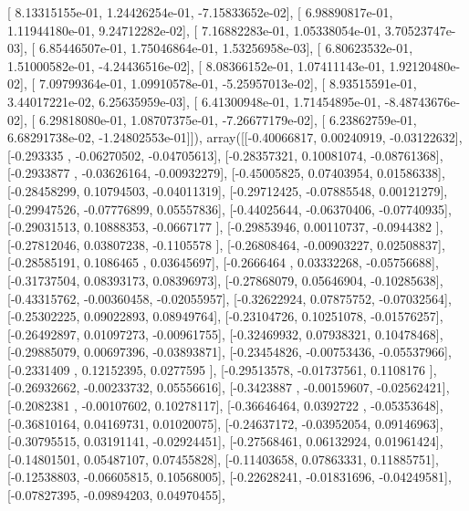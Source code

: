 \documentclass{article}
\begin{document}
       [  8.13315155e-01,   1.24426254e-01,  -7.15833652e-02],
       [  6.98890817e-01,   1.11944180e-01,   9.24712282e-02],
       [  7.16882283e-01,   1.05338054e-01,   3.70523747e-03],
       [  6.85446507e-01,   1.75046864e-01,   1.53256958e-03],
       [  6.80623532e-01,   1.51000582e-01,  -4.24436516e-02],
       [  8.08366152e-01,   1.07411143e-01,   1.92120480e-02],
       [  7.09799364e-01,   1.09910578e-01,  -5.25957013e-02],
       [  8.93515591e-01,   3.44017221e-02,   6.25635959e-03],
       [  6.41300948e-01,   1.71454895e-01,  -8.48743676e-02],
       [  6.29818080e-01,   1.08707375e-01,  -7.26677179e-02],
       [  6.23862759e-01,   6.68291738e-02,  -1.24802553e-01]]), array([[-0.40066817,  0.00240919, -0.03122632],
       [-0.293335  , -0.06270502, -0.04705613],
       [-0.28357321,  0.10081074, -0.08761368],
       [-0.2933877 , -0.03626164, -0.00932279],
       [-0.45005825,  0.07403954,  0.01586338],
       [-0.28458299,  0.10794503, -0.04011319],
       [-0.29712425, -0.07885548,  0.00121279],
       [-0.29947526, -0.07776899,  0.05557836],
       [-0.44025644, -0.06370406, -0.07740935],
       [-0.29031513,  0.10888353, -0.0667177 ],
       [-0.29853946,  0.00110737, -0.0944382 ],
       [-0.27812046,  0.03807238, -0.1105578 ],
       [-0.26808464, -0.00903227,  0.02508837],
       [-0.28585191,  0.1086465 ,  0.03645697],
       [-0.2666464 ,  0.03332268, -0.05756688],
       [-0.31737504,  0.08393173,  0.08396973],
       [-0.27868079,  0.05646904, -0.10285638],
       [-0.43315762, -0.00360458, -0.02055957],
       [-0.32622924,  0.07875752, -0.07032564],
       [-0.25302225,  0.09022893,  0.08949764],
       [-0.23104726,  0.10251078, -0.01576257],
       [-0.26492897,  0.01097273, -0.00961755],
       [-0.32469932,  0.07938321,  0.10478468],
       [-0.29885079,  0.00697396, -0.03893871],
       [-0.23454826, -0.00753436, -0.05537966],
       [-0.2331409 ,  0.12152395,  0.0277595 ],
       [-0.29513578, -0.01737561,  0.1108176 ],
       [-0.26932662, -0.00233732,  0.05556616],
       [-0.3423887 , -0.00159607, -0.02562421],
       [-0.2082381 , -0.00107602,  0.10278117],
       [-0.36646464,  0.0392722 , -0.05353648],
       [-0.36810164,  0.04169731,  0.01020075],
       [-0.24637172, -0.03952054,  0.09146963],
       [-0.30795515,  0.03191141, -0.02924451],
       [-0.27568461,  0.06132924,  0.01961424],
       [-0.14801501,  0.05487107,  0.07455828],
       [-0.11403658,  0.07863331,  0.11885751],
       [-0.12538803, -0.06605815,  0.10568005],
       [-0.22628241, -0.01831696, -0.04249581],
       [-0.07827395, -0.09894203,  0.04970455],
\end{document}
